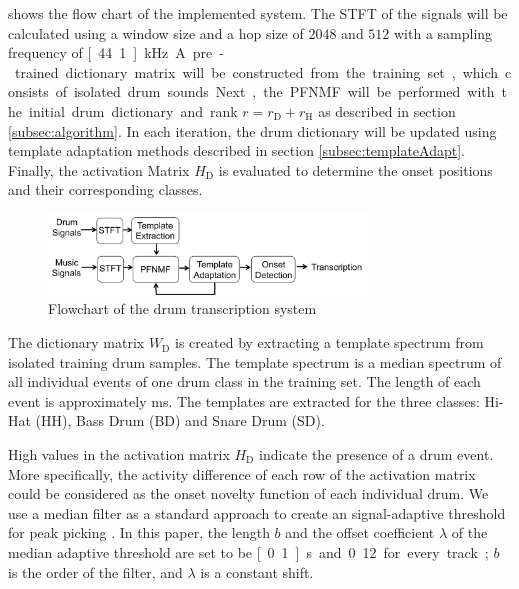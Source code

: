 \documentclass{article}
\begin{document}
 shows the flow chart of the implemented system. The STFT of the signals will be calculated using a window size and a hop size of $2048$ and $512$ with a sampling frequency of \unit[44.1]{kHz}. 
A pre-trained dictionary matrix will be constructed from the training set, which consists of isolated drum sounds. 
Next, the PFNMF will be performed with the initial drum dictionary and rank $r = r_\mathrm{D} + r_\mathrm{H}$ as described in section \ref{subsec:algorithm}. In each iteration, the drum dictionary will be updated using template adaptation methods described in section \ref{subsec:templateAdapt}. Finally, the activation Matrix $H_\mathrm{D}$ is evaluated to determine the onset positions and their corresponding classes.  

\begin{figure}
 \centerline{%
 \includegraphics[width=8.5cm]{flowchart.png}}%
 \caption{Flowchart of the drum transcription system}
 \label{fig:flowchart}
\end{figure}

The dictionary matrix $W_\mathrm{D}$ is created by extracting a template spectrum from isolated training drum samples. The template spectrum is a median spectrum of all individual events of one drum class in the training set. The length of each event  is approximately \unit[80]{ms}. The templates are extracted for the three classes: Hi-Hat (HH), Bass Drum (BD) and Snare Drum (SD).   

High values in the activation matrix $H_\mathrm{D}$ indicate the presence of a drum event. More specifically, the activity difference of each row of the activation matrix could be considered as the onset novelty function of each individual drum. We use a median filter as a standard approach to create an signal-adaptive threshold for peak picking \cite{Lerch2012}. In this paper, the length $b$ and the offset coefficient $\lambda$ of the median adaptive threshold are set to be \unit[0.1]{s} and 0.12 for every track; $b$ is the order of the filter, and $\lambda$ is a constant shift. 
\end{document}
